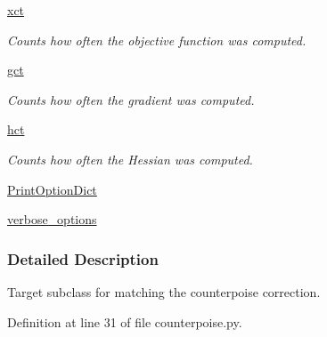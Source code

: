 \begin{DoxyCompactItemize}
\hyperlink{classforcebalance_1_1target_1_1Target_aad2e385cfbf7b4a68f1c2cb41133fe82}{xct}
\begin{DoxyCompactList}\small\item\em Counts how often the objective function was computed. \end{DoxyCompactList}\item 
\hyperlink{classforcebalance_1_1target_1_1Target_aa625ac88c6744eb14ef281d9496d0dbb}{gct}
\begin{DoxyCompactList}\small\item\em Counts how often the gradient was computed. \end{DoxyCompactList}\item 
\hyperlink{classforcebalance_1_1target_1_1Target_a5b5a42f78052b47f29ed4b940c6111a1}{hct}
\begin{DoxyCompactList}\small\item\em Counts how often the Hessian was computed. \end{DoxyCompactList}\item 
\hyperlink{classforcebalance_1_1baseclass_1_1ForceBalanceBaseClass_a5c55e661e746d1a4443f4e0bc34ebe05}{Print\-Option\-Dict}
\item 
\hyperlink{classforcebalance_1_1baseclass_1_1ForceBalanceBaseClass_a8088e1e20cbd6bc175fb9c9fe9fa0f18}{verbose\-\_\-options}
\end{DoxyCompactItemize}


\subsubsection{Detailed Description}
Target subclass for matching the counterpoise correction. 



Definition at line 31 of file counterpoise.\-py.



